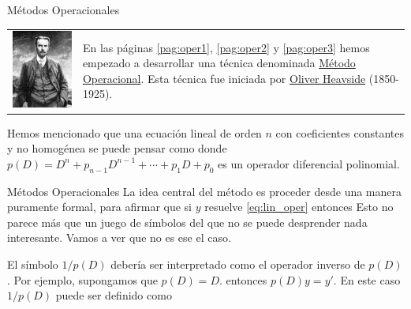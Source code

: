\documentclass[hyperref={colorlinks=true}]{beamer}
\begin{document}
\begin{frame}{Métodos Operacionales}
\begin{tabular}{m{2cm} m{6cm}}
\includegraphics[scale=.6]{imagenes/Heaviside.jpg} &
En las páginas \ref{pag:oper1},  \ref{pag:oper2} y \ref{pag:oper3} hemos empezado a desarrollar una técnica denominada \href{http://en.wikipedia.org/wiki/Operational_calculus}{Método Operacional}. Esta técnica fue iniciada por \href{http://es.wikipedia.org/wiki/Oliver_Heaviside}{Oliver Heavside} (1850-1925).\\
\end{tabular}

Hemos mencionado que una ecuación lineal de orden $n$ con coeficientes constantes y  no homogénea se puede pensar como
 donde $p(D)=D^n+p_{n-1}D^{n-1}+\cdots+p_1D+ p_0$ es un operador diferencial polinomial.



\end{frame}

\begin{frame}{Métodos Operacionales}
La idea central del método es proceder desde una manera puramente formal, para afirmar que si $y$ resuelve
\eqref{eq:lin_oper} entonces 
Esto no parece más que un juego de símbolos del que no se puede desprender nada interesante. Vamos a ver que no es ese el caso. 

El símbolo $1/p(D)$ debería ser interpretado como el operador inverso de $p(D)$. Por ejemplo, supongamos que $p(D)=D$. entonces $p(D)y=y'$. En este caso $1/p(D)$ puede ser definido como





\end{frame}
\end{document}
